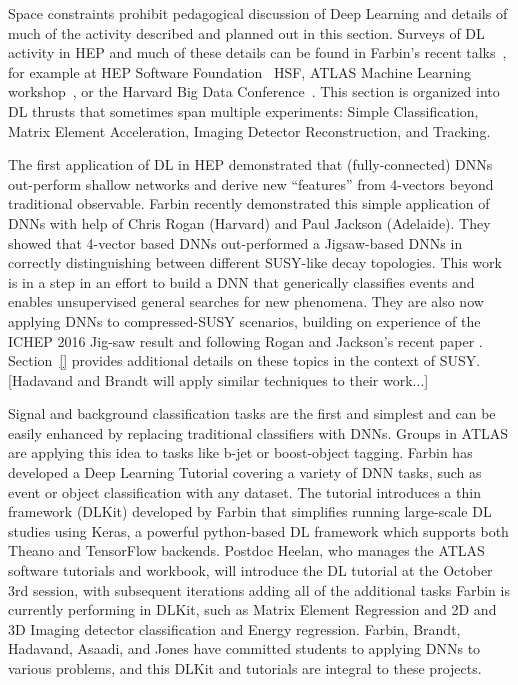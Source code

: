 Space constraints prohibit pedagogical discussion of Deep Learning and
details of much of the activity described and planned out in this
section. Surveys of DL activity in HEP and much of these details can
be found in Farbin's recent talks~\cite{}, for example at HEP Software
Foundation~\cite{} HSF, ATLAS Machine Learning workshop~\cite{}, or
the Harvard Big Data Conference~\cite{}. This section is organized
into DL thrusts that sometimes span multiple experiments: Simple
Classification, Matrix Element Acceleration, Imaging Detector
Reconstruction, and Tracking.


The first application of DL in HEP demonstrated that (fully-connected)
DNNs out-perform shallow networks and derive new ``features'' from
4-vectors beyond traditional observable. Farbin recently demonstrated
this simple application of DNNs with help of Chris Rogan (Harvard) and
Paul Jackson (Adelaide). They showed that 4-vector based DNNs
out-performed a Jigsaw-based DNNs in correctly distinguishing between
different SUSY-like decay topologies. This work is in a step in an
effort to build a DNN that generically classifies events and enables
unsupervised general searches for new phenomena. They are also now
applying DNNs to compressed-SUSY scenarios, building on experience of
the ICHEP 2016 Jig-saw result and following Rogan and Jackson's recent
paper \cite{}. Section~\ref{} provides additional details on these
topics in the context of SUSY. [Hadavand and Brandt will apply similar
  techniques to their work...]

Signal and background classification tasks are the first and simplest
and can be easily enhanced by replacing traditional classifiers with
DNNs. Groups in ATLAS are applying this idea to tasks like b-jet or
boost-object tagging. Farbin has developed a Deep Learning Tutorial
covering a variety of DNN tasks, such as event or object
classification with any dataset.  The tutorial introduces a thin
framework (DLKit) developed by Farbin that simplifies running
large-scale DL studies using Keras, a powerful python-based DL
framework which supports both Theano and TensorFlow backends.  Postdoc
Heelan, who manages the ATLAS software tutorials and workbook, will
introduce the DL tutorial at the October 3rd session, with subsequent
iterations adding all of the additional tasks Farbin is currently
performing in DLKit, such as Matrix Element Regression and 2D and 3D
Imaging detector classification and Energy regression. Farbin, Brandt,
Hadavand, Asaadi, and Jones have committed students to applying DNNs
to various problems, and this DLKit and tutorials are integral to
these projects.

